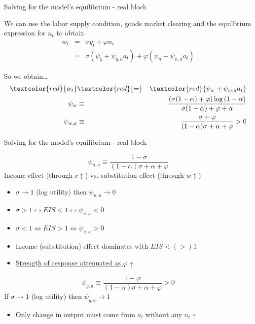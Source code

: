 

\begin{frame}{Solving for the model's equilibrium - real block}

We can use the labor supply condition, goods market clearing and the equilbrium expression for $n_{t}$
to obtain
\begin{eqnarray*}
w_{t} 	&=& \sigma y_{t} + \varphi n_{t} \\
		&=& \sigma( \psi_{y} + \psi_{y,a} a_{t} ) + \varphi (\psi_{n} + \psi_{n,a} a_{t})
\end{eqnarray*}

So we obtain\ldots
\begin{eqnarray}
\textcolor{red}{w_{t}}	&\textcolor{red}{=}& \textcolor{red}{\psi_{w} + \psi_{w,a} a_{t}} \\
\psi_{w}	& \equiv & \frac{(\sigma(1-\alpha)+\varphi)\log{(1-\alpha)}}{\sigma(1-\alpha)+\varphi + \alpha} \nonumber \\
\psi_{w,a} &\equiv& \frac{\sigma + \varphi}{(1-\alpha)\sigma+\alpha+\varphi} > 0 \nonumber
\end{eqnarray}

\end{frame}



\begin{frame}[label=wageresponse]{Solving for the model's equilibrium - real block}

\[
\psi_{n,a} \equiv \frac{1-\sigma}{\left( 1 - \alpha \right) \sigma + \alpha + \varphi}
\]
Income effect (through $c\uparrow$) vs. substitution effect (through $w\uparrow$) 
\begin{itemize}
\item	$\sigma \rightarrow 1$ (log utility) then $\psi_{n,a}\rightarrow 0$
\item	$\sigma > 1 \Leftrightarrow EIS < 1 \Leftrightarrow \psi_{n,a} <  0$
\item	$\sigma < 1 \Leftrightarrow EIS > 1 \Leftrightarrow \psi_{n,a} > 0$
\item	Income (substitution) effect dominates with $ EIS <(>) 1$
\item	\hyperlink{utfn}{Strength of response attenuated as $\varphi \uparrow$}
\end{itemize}

\[
\psi_{y,a} \equiv \frac{1+\varphi}{\left( 1 - \alpha \right) \sigma + \alpha + \varphi} > 0
\]
If $\sigma \rightarrow 1$ (log utility) then $\psi_{y,a}\rightarrow 1$
\begin{itemize}
\item	Only change in output must come from $a_{t}$ without any $n_{t}\uparrow$
\end{itemize}

\end{frame}


